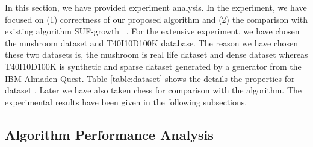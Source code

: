 In this section, we have provided experiment analysis. In the experiment, we have focused on (1) correctness of our proposed algorithm and (2) the comparison with existing algorithm SUF-growth ~\cite{suf_growth}. For the extensive experiment, we have chosen the mushroom dataset  and T40I10D100K database. The reason we have chosen these two datasets is, the mushroom  is real life dataset and dense dataset whereas T40I10D100K  is synthetic and sparse dataset generated by a generator from the IBM Almaden Quest. Table \ref{table:dataset} shows the details the properties for dataset . Later we have also taken chess  for comparison with the algorithm. The experimental results have been given in the following subsections.
\subsection{Algorithm Performance Analysis}

